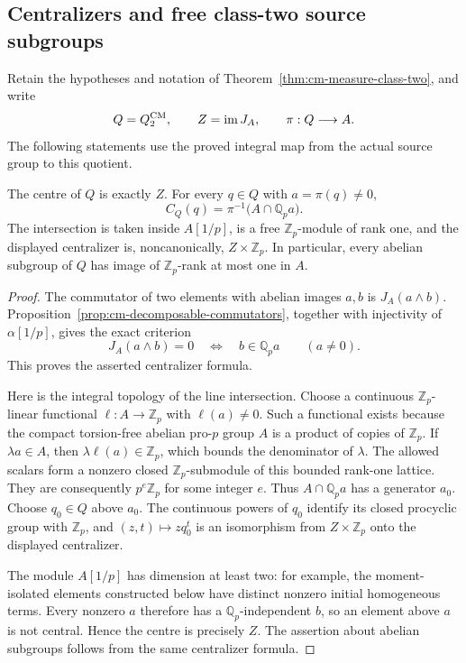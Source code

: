 \subsection{Centralizers and free class-two source subgroups}
\label{subsec:cm-class-two-subgroups}

Retain the hypotheses and notation of
Theorem~\ref{thm:cm-measure-class-two}, and write
\[
 Q=Q_2^{\rm CM},\qquad Z=\operatorname{im}J_A,
 \qquad \pi:Q\longrightarrow A.
\]
The following statements use the proved integral map from the
actual source group to this quotient.

\begin{proposition}\label{prop:cm-class-two-centralizers}
The centre of \(Q\) is exactly \(Z\).  For every \(q\in Q\)
with \(a=\pi(q)\ne0\),
\[
 C_Q(q)=\pi^{-1}\bigl(A\cap\mathbb Q_p a\bigr).
\]
The intersection is taken inside \(A[1/p]\), is a free
\(\mathbb Z_p\)-module of rank one, and the displayed
centralizer is, noncanonically, \(Z\times\mathbb Z_p\).
In particular, every abelian subgroup of \(Q\) has image
of \(\mathbb Z_p\)-rank at most one in \(A\).
\end{proposition}

\begin{proof}
The commutator of two elements with abelian images \(a,b\)
is \(J_A(a\wedge b)\).  Proposition~\ref{prop:cm-decomposable-commutators}, together
with injectivity of \(\alpha[1/p]\), gives the exact criterion
\[
 J_A(a\wedge b)=0\quad\Longleftrightarrow\quad
 b\in\mathbb Q_pa\qquad(a\ne0).
\]
This proves the asserted centralizer formula.

Here is the integral topology of the line intersection.
Choose a continuous \(\mathbb Z_p\)-linear functional
\(\ell:A\to\mathbb Z_p\) with \(\ell(a)\ne0\).
Such a functional exists because the compact torsion-free
abelian pro-\(p\) group \(A\) is a product of copies of
\(\mathbb Z_p\).  If \(\lambda a\in A\), then
\(\lambda\ell(a)\in\mathbb Z_p\), which bounds the
denominator of \(\lambda\).  The allowed scalars form a
nonzero closed \(\mathbb Z_p\)-submodule of this bounded
rank-one lattice.  They are consequently \(p^e\mathbb Z_p\)
for some integer \(e\).  Thus \(A\cap\mathbb Q_pa\)
has a generator \(a_0\).  Choose \(q_0\in Q\) above
\(a_0\).  The continuous powers of \(q_0\) identify
its closed procyclic group with \(\mathbb Z_p\), and
\((z,t)\mapsto zq_0^t\) is an isomorphism from
\(Z\times\mathbb Z_p\) onto the displayed centralizer.

The module \(A[1/p]\) has dimension at least two: for
example, the moment-isolated elements constructed below
have distinct nonzero initial homogeneous terms.
Every nonzero \(a\) therefore has a \(\mathbb Q_p\)-independent
\(b\), so an element above \(a\) is not central.
Hence the centre is precisely \(Z\).  The assertion about
abelian subgroups follows from the same centralizer formula.
\end{proof}

